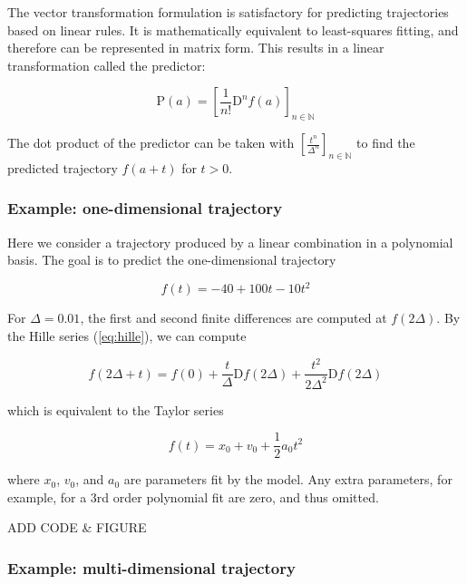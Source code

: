\documentclass{article}
\begin{document}
The vector transformation formulation is satisfactory for predicting trajectories
based on linear rules.
It is mathematically equivalent to least-squares fitting, and therefore can be represented in matrix form.
This results in a linear transformation called the predictor:

\begin{equation}
  \mathrm{P}(a) = \left[ \frac{1}{n!} \mathrm{D}^n f(a) \right]_{n \in \mathbb{N}}
\end{equation}

The dot product of the predictor can be taken with $\left[ \frac{t^n}{\Delta^n} \right]_{n \in \mathbb{N}}$
to find the predicted trajectory $f(a + t)$ for $t > 0$.

\subsubsection{Example: one-dimensional trajectory}

Here we consider a trajectory produced by a linear combination in a polynomial basis.
The goal is to predict the one-dimensional trajectory

\begin{equation}
  f(t) = -40 + 100 t - 10 t^2
\end{equation}

For $\Delta = 0.01$, the first and second finite differences
are computed at $f(2\Delta)$.
By the Hille series (\ref{eq:hille}), we can compute

\begin{equation}
	f(2\Delta + t) = f(0) + \frac{t}{\Delta} \mathrm{D}f(2\Delta) + \frac{t^2}{2 \Delta^2} \mathrm{D}f(2\Delta)
\end{equation}

which is equivalent to the Taylor series

\begin{equation}
  f(t) = x_0 + v_0 + \frac{1}{2} a_0 t^2
\end{equation}

where $x_0$, $v_0$, and $a_0$ are parameters fit by the model.
Any extra parameters, for example, for a 3rd order polynomial fit are zero, and thus omitted.

ADD CODE \& FIGURE

\subsubsection{Example: multi-dimensional trajectory}
\end{document}
